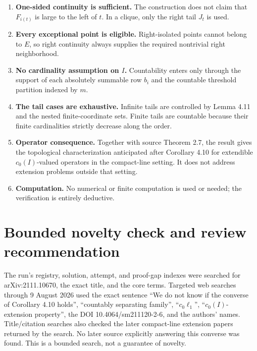 \documentclass[11pt]{article}
\begin{document}
\begin{enumerate}[leftmargin=*,itemsep=0.6em]
\item \textbf{One-sided continuity is sufficient.} The construction does not
claim that $F_{i(t)}$ is large to the left of $t$. In a clique, only the
right tail $J_t$ is used.

\item \textbf{Every exceptional point is eligible.} Right-isolated points
cannot belong to $E$, so right continuity always supplies the required
nontrivial right neighborhood.

\item \textbf{No cardinality assumption on $I$.} Countability enters only
through the support of each absolutely summable row $b_i$ and the countable
threshold partition indexed by $m$.

\item \textbf{The tail cases are exhaustive.} Infinite tails are controlled
by Lemma 4.11 and the nested finite-coordinate sets. Finite tails are
countable because their finite cardinalities strictly decrease along the
order.

\item \textbf{Operator consequence.} Together with source Theorem 2.7, the
result gives the topological characterization anticipated after Corollary
4.10 for extendible $c_0(I)$-valued operators in the compact-line setting.
It does not address extension problems outside that setting.

\item \textbf{Computation.} No numerical or finite computation is used or
needed; the verification is entirely deductive.
\end{enumerate}

\section{Bounded novelty check and review recommendation}

The run's registry, solution, attempt, and proof-gap indexes were searched for
arXiv:2111.10670, the exact title, and the core terms. Targeted web searches
through 9 August 2026 used the exact sentence ``We do not know if the converse
of Corollary 4.10 holds'', ``countably separating family'', ``$c_0\ell_1$'',
``$c_0(I)$-extension property'', the DOI 10.4064/sm211120-2-6, and the authors'
names. Title/citation searches also checked the later compact-line extension
papers returned by the search. No later source explicitly answering this
converse was found. This is a bounded search, not a guarantee of novelty.
\end{document}
